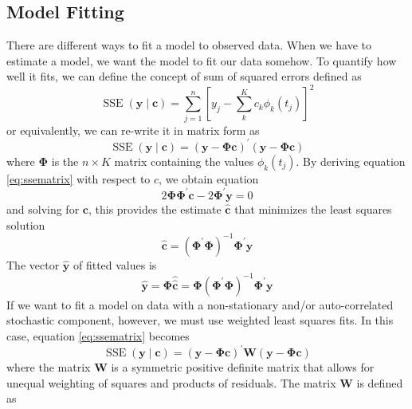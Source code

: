 \subsection{Model Fitting}
There are different ways to fit a model to observed data. When we have to estimate a model, we want the model to fit our data somehow. To quantify how well it fits, we can define the concept of sum of squared errors defined as
\begin{equation}
    \label{eq:sse}
    \operatorname{SSE}(\mathbf{y} \mid \mathbf{c})=\sum_{j=1}^n\left[y_j-\sum_k^K c_k \phi_k\left(t_j\right)\right]^2
\end{equation}
or equivalently, we can re-write it in matrix form as
\begin{equation}
    \label{eq:ssematrix}
    \operatorname{SSE}(\bm{y} \mid \mathbf{c})=(\mathbf{y}-\bm{\Phi} \mathbf{c})^{\prime}(\mathbf{y}-\bm{\Phi} \mathbf{c})
\end{equation}
where $\bm{\Phi}$ is the $n \times K$ matrix containing the values $\phi_k(t_j)$. By deriving equation \ref{eq:ssematrix} with respect to $c$, we obtain equation
\begin{equation}
 \label{eq:c}
    2 \bm{\Phi} \bm{\Phi}^{\prime} \mathbf{c}-2 \bm{\Phi}^{\prime} \mathbf{y}=0
\end{equation}
and solving for $\mathbf{c}$, this provides the estimate $\hat{\mathbf{c}}$ that minimizes the least squares solution
\begin{equation}
    \label{eq:cestimated}
    \hat{\mathbf{c}}=\left(\bm{\Phi}^{\prime} \bm{\Phi}\right)^{-1} \bm{\Phi}^{\prime} \mathbf{y}
\end{equation}
The vector $\hat{\mathbf{y}}$ of fitted values is
\begin{equation}
    \hat{\mathbf{y}}=\bm{\Phi} \hat{\hat{\mathbf{c}}}=\bm{\Phi}\left(\bm{\Phi}^{\prime} \bm{\Phi}\right)^{-1} \bm{\Phi}^{\prime} \mathbf{y}
\end{equation}
If we want to fit a model on data with a non-stationary and/or auto-correlated stochastic component, however, we must use weighted least squares fits. In this case, equation \ref{eq:ssematrix} becomes
\begin{equation}
    \label{eq:wls}
    \operatorname{SSE}(\mathbf{y} \mid \mathbf{c})=(\mathbf{y}-\bm{\Phi} \mathbf{c})^{\prime} \mathbf{W}(\mathbf{y}-\bm{\Phi} \mathbf{c})
\end{equation}
where the matrix $\mathbf{W}$ is a symmetric positive definite matrix that allows for unequal weighting of squares and products of residuals. The matrix $\mathbf{W}$ is defined as
